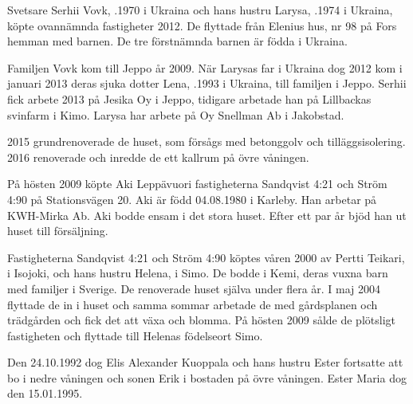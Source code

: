 %
Svetsare Serhii Vovk, .1970 i Ukraina och hans hustru Larysa, .1974 i Ukraina, köpte ovannämnda fastigheter 2012. De flyttade från Elenius hus, nr 98 på Fors hemman med barnen.	De tre förstnämnda barnen är födda i Ukraina.
\begin{jhchildren}
  \item {}
  \item {}
  \item {}
  \item {}
\end{jhchildren}

Familjen Vovk kom  till Jeppo år 2009. När Larysas far i Ukraina dog 	2012 kom i januari 2013 deras sjuka dotter Lena,  .1993 i Ukraina, till familjen i Jeppo. Serhii fick arbete 2013 på Jesika Oy i Jeppo, tidigare arbetade han på Lillbackas svinfarm i Kimo. Larysa har arbete på Oy Snellman Ab i	Jakobstad.

2015 grundrenoverade de huset, som försågs med betonggolv och tilläggsisolering. 2016 renoverade och inredde de ett kallrum på övre våningen.


%
På hösten 2009 köpte Aki Leppävuori fastigheterna Sandqvist 4:21 och Ström 4:90 på Stationsvägen 20. Aki är född 04.08.1980 i Karleby. Han arbetar på KWH-Mirka Ab. Aki bodde ensam i det stora huset. Efter	ett par år bjöd han ut huset till försäljning.


%
Fastigheterna Sandqvist 4:21 och Ström 4:90 köptes våren 2000 av	Pertti Teikari,  i Isojoki, och hans hustru Helena,  i Simo. De bodde i Kemi, deras vuxna barn med familjer i Sverige. De renoverade huset själva under flera år. I maj 2004 flyttade de in i huset och samma sommar arbetade de med gårdsplanen och	trädgården och fick det att växa och blomma. På hösten 2009 sålde de plötsligt fastigheten och flyttade till Helenas födelseort Simo.


%
Den 24.10.1992 dog Elis Alexander Kuoppala och hans hustru Ester fortsatte att bo i nedre våningen och sonen Erik i bostaden på övre våningen. Ester Maria dog den 15.01.1995.


